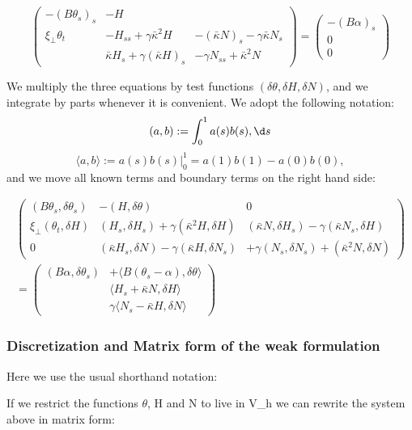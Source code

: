 \[\begin{pmatrix}
-(B\theta_s)_s & -H &  \\
\xi_\perp\theta_t & 
- H_{ss} + \gamma \bar \kappa^2H &
- (\bar\kappa N)_s - \gamma\bar\kappa N_s \\
 & 
\bar \kappa H_s +\gamma(\bar \kappa H)_s &
 - \gamma N_{ss} + \bar \kappa^2 N
\end{pmatrix}
%
=
\begin{pmatrix}
-(B\alpha)_s\\
0\\
0
\end{pmatrix}\]

We multiply the three equations by test functions
$(\delta \theta, \delta H, \delta N)$, and we integrate by parts
whenever it is convenient. We adopt the following notation:
\[
(a,b) := \int_0^1 a(s) b(s) ,\d s
\]
\[
\langle a,b \rangle := a(s) b(s) \big|^1_0 = a(1)b(1)-a(0)b(0),
\]
and we move all known terms and boundary terms on the right hand side:

\begin{multline}
\begin{pmatrix}
(B\theta_s, \delta \theta_s)  &  -(H,\delta\theta)  & 0 \\
\xi_\perp(\theta_t, \delta H) & 
(H_{s}, \delta H_s) 
+ \gamma (\bar \kappa^2 H, \delta H ) &
 (\bar\kappa N, \delta H_s) 
- \gamma(\bar\kappa N_s, \delta H) \\
0 & 
(\bar \kappa H_s, \delta N) 
-\gamma(\bar \kappa H, \delta N_s) &
%
%
+ \gamma(N_{s},\delta N_s) 
+ (\bar \kappa^2 N, \delta N)
\end{pmatrix}
%
\\
=
\begin{pmatrix}
(B\alpha, \delta \theta_s)& +\langle B(\theta_s-\alpha), \delta \theta\rangle\\
& \langle H_s+\bar\kappa N,\delta H\rangle
\\
&\gamma\langle N_{s}-\bar \kappa H, \delta N \rangle 
\end{pmatrix}
\end{multline}

\subsubsection{Discretization and Matrix form of the weak formulation}\label{matrix-form-of-the-weak-formulation}

Here we use the usual shorthand notation:


If we restrict the functions $\theta$, H and N to live in V_h we can rewrite the system above in matrix form:


